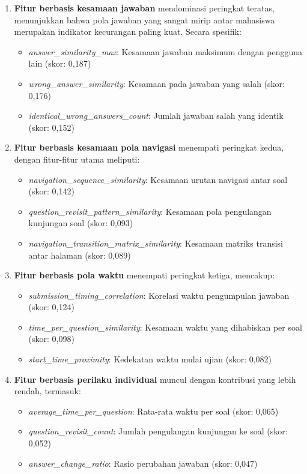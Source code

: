 \begin{enumerate}
    \item \textbf{Fitur berbasis kesamaan jawaban} mendominasi peringkat teratas, menunjukkan bahwa pola jawaban yang sangat mirip antar mahasiswa merupakan indikator kecurangan paling kuat. Secara spesifik:
    \begin{itemize}
        \item \textit{answer\_similarity\_max}: Kesamaan jawaban maksimum dengan pengguna lain (skor: 0,187)
        \item \textit{wrong\_answer\_similarity}: Kesamaan pada jawaban yang salah (skor: 0,176)
        \item \textit{identical\_wrong\_answers\_count}: Jumlah jawaban salah yang identik (skor: 0,152)
    \end{itemize}
    
    \item \textbf{Fitur berbasis kesamaan pola navigasi} menempati peringkat kedua, dengan fitur-fitur utama meliputi:
    \begin{itemize}
        \item \textit{navigation\_sequence\_similarity}: Kesamaan urutan navigasi antar soal (skor: 0,142)
        \item \textit{question\_revisit\_pattern\_similarity}: Kesamaan pola pengulangan kunjungan soal (skor: 0,093)
        \item \textit{navigation\_transition\_matrix\_similarity}: Kesamaan matriks transisi antar halaman (skor: 0,089)
    \end{itemize}
    
    \item \textbf{Fitur berbasis pola waktu} menempati peringkat ketiga, mencakup:
    \begin{itemize}
        \item \textit{submission\_timing\_correlation}: Korelasi waktu pengumpulan jawaban (skor: 0,124)
        \item \textit{time\_per\_question\_similarity}: Kesamaan waktu yang dihabiskan per soal (skor: 0,098)
        \item \textit{start\_time\_proximity}: Kedekatan waktu mulai ujian (skor: 0,082)
    \end{itemize}
    
    \item \textbf{Fitur berbasis perilaku individual} muncul dengan kontribusi yang lebih rendah, termasuk:
    \begin{itemize}
        \item \textit{average\_time\_per\_question}: Rata-rata waktu per soal (skor: 0,065)
        \item \textit{question\_revisit\_count}: Jumlah pengulangan kunjungan ke soal (skor: 0,052)
        \item \textit{answer\_change\_ratio}: Rasio perubahan jawaban (skor: 0,047)
    \end{itemize}
\end{enumerate}

